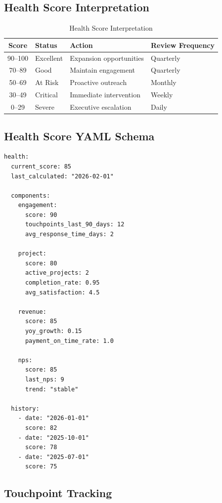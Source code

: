 \subsection{Health Score Interpretation}

\begin{table}[htbp]
\centering
\caption{Health Score Interpretation}
\label{tab:bp-health-interpretation}
\renewcommand{\arraystretch}{1.3}
\begin{tabular}{@{}clll@{}}
\toprule
\textbf{Score} & \textbf{Status} & \textbf{Action} & \textbf{Review Frequency} \\
\midrule
90--100 & Excellent & Expansion opportunities & Quarterly \\
70--89 & Good & Maintain engagement & Quarterly \\
50--69 & At Risk & Proactive outreach & Monthly \\
30--49 & Critical & Immediate intervention & Weekly \\
0--29 & Severe & Executive escalation & Daily \\
\bottomrule
\end{tabular}
\end{table}

\subsection{Health Score YAML Schema}

\begin{verbatim}
health:
  current_score: 85
  last_calculated: "2026-02-01"

  components:
    engagement:
      score: 90
      touchpoints_last_90_days: 12
      avg_response_time_days: 2

    project:
      score: 80
      active_projects: 2
      completion_rate: 0.95
      avg_satisfaction: 4.5

    revenue:
      score: 85
      yoy_growth: 0.15
      payment_on_time_rate: 1.0

    nps:
      score: 85
      last_nps: 9
      trend: "stable"

  history:
    - date: "2026-01-01"
      score: 82
    - date: "2025-10-01"
      score: 78
    - date: "2025-07-01"
      score: 75
\end{verbatim}

\subsection{Touchpoint Tracking}

